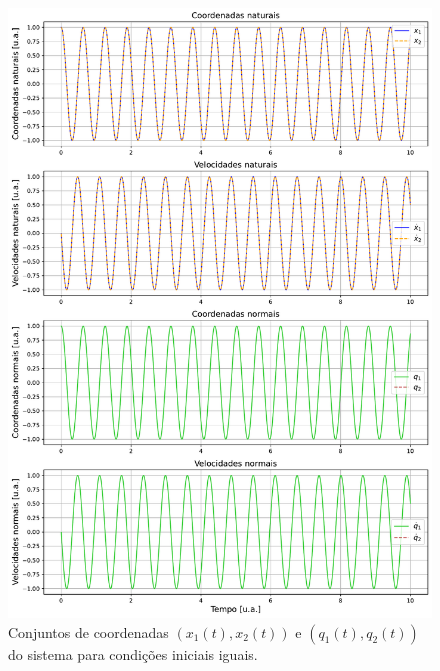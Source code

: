 \documentclass[a4paper, 11pt]{article}
\begin{document}
    \begin{figure}[h!]
        \centering
        \includegraphics[width=1\linewidth]{graph_coordenadas_iguais.pdf}
        \caption{ Conjuntos de coordenadas $(x_1(t),x_2(t))$ e $(q_1(t),q_2(t))$ do sistema para condições iniciais iguais.
        \label{figura :: coordenadas condições iguais}}
    \end{figure}


    
    
\end{document}

